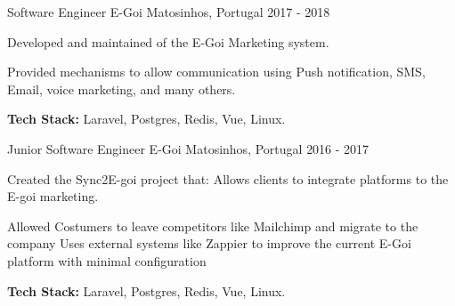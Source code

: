 \begin{cventries}
  \cventry
    {Software Engineer} %
    {E-Goi} %
    {Matosinhos, Portugal} %
    {2017 - 2018} %
    {
      \begin{cvitems} %
        \item {Developed and maintained of the E-Goi Marketing system.}
        \item {Provided mechanisms to allow communication using Push notification, SMS, Email, voice marketing, and many others.}
        \item {\textbf{Tech Stack:} Laravel, Postgres, Redis, Vue, Linux.}
      \end{cvitems}
    }

  \cventry
    {Junior Software Engineer} %
    {E-Goi} %
    {Matosinhos, Portugal} %
    {2016 - 2017} %
    {
      \begin{cvitems} %
        \item {Created the Sync2E-goi project that: Allows clients to integrate platforms to the E-goi marketing.}
        \item {Allowed Costumers to leave competitors like Mailchimp and migrate to the company Uses external systems like Zappier to improve the current E-Goi platform with minimal configuration}
        \item {\textbf{Tech Stack:} Laravel, Postgres, Redis, Vue, Linux.}
      \end{cvitems}
    }

\end{cventries}
